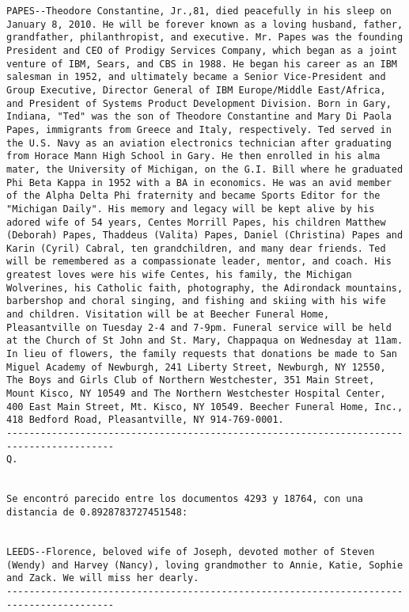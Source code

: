 \documentclass[11pt]{article}
\begin{document}
\begin{Verbatim}[commandchars=\\\{\}]
PAPES--Theodore Constantine, Jr.,81, died peacefully in his sleep on January 8, 2010. He will be forever known as a loving husband, father, grandfather, philanthropist, and executive. Mr. Papes was the founding President and CEO of Prodigy Services Company, which began as a joint venture of IBM, Sears, and CBS in 1988. He began his career as an IBM salesman in 1952, and ultimately became a Senior Vice-President and Group Executive, Director General of IBM Europe/Middle East/Africa, and President of Systems Product Development Division. Born in Gary, Indiana, "Ted" was the son of Theodore Constantine and Mary Di Paola Papes, immigrants from Greece and Italy, respectively. Ted served in the U.S. Navy as an aviation electronics technician after graduating from Horace Mann High School in Gary. He then enrolled in his alma mater, the University of Michigan, on the G.I. Bill where he graduated Phi Beta Kappa in 1952 with a BA in economics. He was an avid member of the Alpha Delta Phi fraternity and became Sports Editor for the "Michigan Daily". His memory and legacy will be kept alive by his adored wife of 54 years, Centes Morrill Papes, his children Matthew (Deborah) Papes, Thaddeus (Valita) Papes, Daniel (Christina) Papes and Karin (Cyril) Cabral, ten grandchildren, and many dear friends. Ted will be remembered as a compassionate leader, mentor, and coach. His greatest loves were his wife Centes, his family, the Michigan Wolverines, his Catholic faith, photography, the Adirondack mountains, barbershop and choral singing, and fishing and skiing with his wife and children. Visitation will be at Beecher Funeral Home, Pleasantville on Tuesday 2-4 and 7-9pm. Funeral service will be held at the Church of St John and St. Mary, Chappaqua on Wednesday at 11am. In lieu of flowers, the family requests that donations be made to San Miguel Academy of Newburgh, 241 Liberty Street, Newburgh, NY 12550, The Boys and Girls Club of Northern Westchester, 351 Main Street, Mount Kisco, NY 10549 and The Northern Westchester Hospital Center, 400 East Main Street, Mt. Kisco, NY 10549. Beecher Funeral Home, Inc., 418 Bedford Road, Pleasantville, NY 914-769-0001.
-----------------------------------------------------------------------------------------
Q.


Se encontró parecido entre los documentos 4293 y 18764, con una distancia de 0.8928783727451548:


LEEDS--Florence, beloved wife of Joseph, devoted mother of Steven (Wendy) and Harvey (Nancy), loving grandmother to Annie, Katie, Sophie and Zack. We will miss her dearly.
-----------------------------------------------------------------------------------------




\end{Verbatim}
\end{document}
